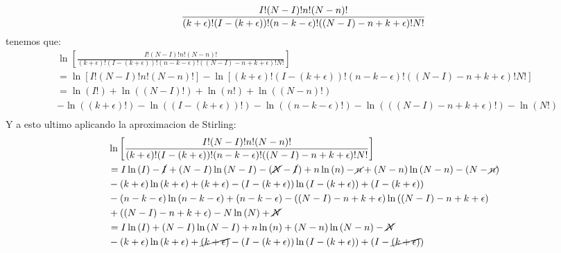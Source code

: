 \begin{answer}
    $$
         \frac{I!(N-I)!n!(N-n)!}{(k + \epsilon)!(I - (k+\epsilon))!(n - k-\epsilon)!((N-I) - n + k+\epsilon)!N!} \\
        $$
        tenemos que:
        \begin{align*}
            &\ln \left[
            \frac{I!(N-I)!n!(N-n)!}{(k + \epsilon)!(I - (k+\epsilon))!(n - k-\epsilon)!((N-I) - n + k+\epsilon)!N!}
            \right] \\
            &= \ln \left[I! (N-I)! n! (N-n)! \right] - \ln \left[(k + \epsilon)! (I - (k+\epsilon))! (n - k-\epsilon)! ((N-I) - n + k+\epsilon)! N! \right] \\
            &= \ln \left(I!\right) + \ln \left((N-I)!\right) + \ln \left(n!\right) + \ln \left((N-n)!\right) \\
            &- \ln \left((k + \epsilon)!\right) - \ln \left((I - (k+\epsilon))!\right) - \ln \left((n - k-\epsilon)!\right) - \ln \left(((N-I) - n + k+\epsilon)!\right) - \ln \left(N!\right)  \\
        \end{align*}
        Y a esto ultimo aplicando la aproximacion de Stirling:
        \begin{align*}
            &\ln \left[
            \frac{I!(N-I)!n!(N-n)!}{(k + \epsilon)!(I - (k+\epsilon))!(n - k-\epsilon)!((N-I) - n + k+\epsilon)!N!}
            \right] \\
            &= I \ln \left(I\right) - \cancel I + ( N-I) \ln \left(N-I\right) - (\cancel N-\cancel I) + n \ln \left(n\right) - \cancel n + (N-n) \ln \left(N-n\right) - (N-\cancel n) \\
            &- (k + \epsilon) \ln \left(k + \epsilon\right) + (k + \epsilon) - (I - (k+\epsilon)) \ln \left(I - (k+\epsilon)\right) + (I - (k+\epsilon)) \\
            &- (n - k-\epsilon) \ln \left(n - k-\epsilon\right) + (n - k-\epsilon) - ((N-I) - n + k+\epsilon) \ln \left((N-I) - n + k+\epsilon\right) \\
            &+ ((N-I) - n + k+\epsilon) - N \ln \left(N\right) +\cancel N \\
            &= I \ln \left(I\right)  + ( N-I) \ln \left(N-I\right) + n \ln \left(n\right)  + (N-n) \ln \left(N-n\right) - \cancel N \\
            &- (k + \epsilon) \ln \left(k + \epsilon\right) + \cancel{(k + \epsilon)} - (I - (k+\epsilon)) \ln \left(I - (k+\epsilon)\right) + (I - \cancel{(k+\epsilon)}) \\

\end{align*}
\end{answer}
